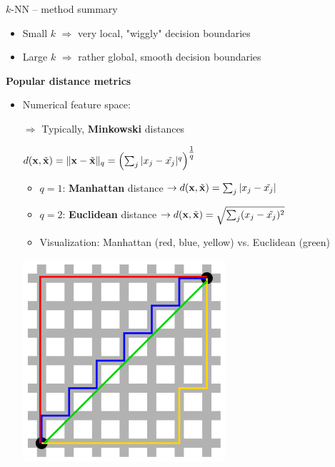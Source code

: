 \documentclass[11pt,compress,t,notes=noshow, xcolor=table]{beamer}
\newcommand{\highlight}[1]{\textcolor{hlcol}{\textbf{#1}}}
\begin{document}
\begin{vbframe}{$k$-NN -- method summary}
  \medskip

  \begin{itemize}
      \item Small $k$ $\Rightarrow$ very local, "wiggly" decision boundaries
      \item Large $k$ $\Rightarrow$ rather global, smooth decision boundaries
  \end{itemize}

  \bigskip
  \bigskip
  \bigskip

  \highlight{Popular distance metrics}

\begin{itemize}
  \item Numerical feature space:\\
  \begin{minipage}{0.7\textwidth}
  $\Rightarrow$ Typically, \textbf{Minkowski} distances

  $d(\mathbf{x}, \tilde{\mathbf{x}}) = \|\mathbf{x} - \tilde{\mathbf{x}} \|_q = 
  \left( \sum_j | x_j - \tilde{x_j} |^q
  \right)^{\tfrac{1}{q}}$
  \begin{itemize}
    \item $q = 1$: \textbf{Manhattan} distance $\rightarrow d(\mathbf{x}, \tilde{\mathbf{x}}) =
    \sum_j | x_j - \tilde{x_j} |$
  \item $q = 2$: \textbf{Euclidean} distance $\rightarrow d(\mathbf{x}, \tilde{\mathbf{x}}) =
  \sqrt{\sum_j (x_j - \tilde{x_j})^2}$
  \item Visualization: Manhattan (red, blue, yellow) vs. Euclidean (green)
  \end{itemize}
\end{minipage}%
\begin{minipage}{0.25\textwidth}
 \begin{center}
  \includegraphics[width=.6\textwidth]{figure/manhattan_distance.png} %
 \end{center}
\end{minipage}
    \medskip


\end{itemize}
\end{vbframe}
\end{document}
